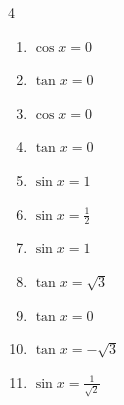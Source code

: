 \begin{multicols}{4}
\begin{enumerate}

  \item $\displaystyle \cos{x}  = 0$


  \item $\displaystyle \tan{x}  = 0$

        \phantom{$\displaystyle x = 0 , \pi$}

  \item $\displaystyle \cos{x}  = 0$


  \item $\displaystyle \tan{x}  = 0$

        \phantom{$\displaystyle x = 0 , \pi$}

  \item $\displaystyle \sin{x}  = 1$


  \item $\displaystyle \sin{x}  = \frac{1}{2}$


  \item $\displaystyle \sin{x}  = 1$


  \item $\displaystyle \tan{x}  = \sqrt{3}$


  \item $\displaystyle \tan{x}  = 0$

        \phantom{$\displaystyle x = 0 , \pi$}

  \item $\displaystyle \tan{x}  = -\sqrt{3}$


  \item $\displaystyle \sin{x}  = \frac{1}{\sqrt{2}}$


\columnbreak %


\end{enumerate}
\end{multicols}
